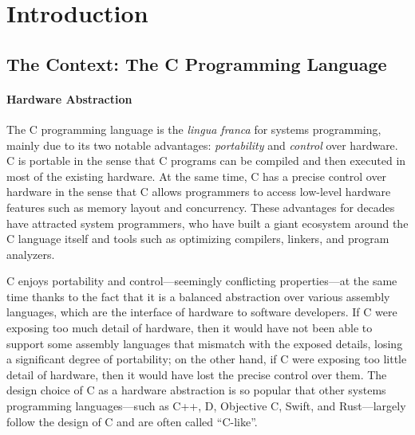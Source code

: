 \section{Introduction}
\label{sec:introduction}

\subsection{The Context: The C Programming Language}
\label{sec:introduction:context}

\paragraph{Hardware Abstraction}

The C programming language is the \emph{lingua franca} for systems programming, mainly due to its
two notable advantages: \emph{portability} and \emph{control} over hardware.  C is portable in the
sense that C programs can be compiled and then executed in most of the existing hardware.  At the
same time, C has a precise control over hardware in the sense that C allows programmers to access
low-level hardware features such as memory layout and concurrency.  These advantages for decades
have attracted system programmers, who have built a giant ecosystem around the C language itself and
tools such as optimizing compilers, linkers, and program analyzers.

C enjoys portability and control---seemingly conflicting properties---at the same time thanks to the
fact that it is a balanced abstraction over various assembly languages, which are the interface of
hardware to software developers.  If C were exposing too much detail of hardware, then it would have
not been able to support some assembly languages that mismatch with the exposed details, losing a
significant degree of portability; on the other hand, if C were exposing too little detail of
hardware, then it would have lost the precise control over them.  The design choice of C as a
hardware abstraction is so popular that other systems programming languages---such as C++, D,
Objective C, Swift, and Rust---largely follow the design of C and are often called ``C-like''.




